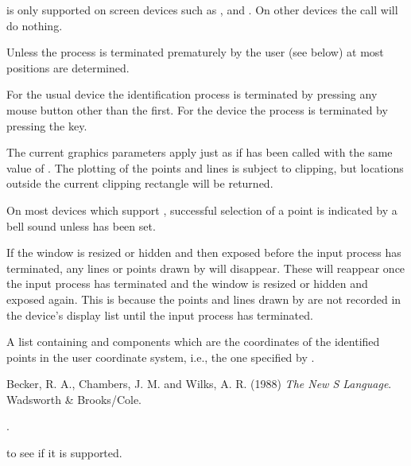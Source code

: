 \begin{Details}\relax
{} is only supported on screen devices such as
,  and .  On other devices the
call will do nothing.

Unless the process is terminated prematurely by the user (see below)
at most  positions are determined.

For the usual  device the identification process is
terminated by pressing any mouse button other than the first.
For the  device the process is terminated by
pressing the  key.

The current graphics parameters apply just as if 
has been called with the same value of . The plotting of
the points and lines is subject to clipping, but locations outside the
current clipping rectangle will be returned.

On most devices which support , successful selection of
a point is indicated by a bell sound unless
 has been set.

If the window is resized or hidden and then exposed before the input
process has terminated, any lines or points drawn by 
will disappear.  These will reappear once the input process has
terminated and the window is resized or hidden and exposed again.
This is because the points and lines drawn by  are not
recorded in the device's display list until the input process has
terminated.
\end{Details}
%
\begin{Value}
A list containing  and  components which are the
coordinates of the identified points in the user coordinate system,
i.e., the one specified by .
\end{Value}
%
\begin{References}\relax
Becker, R. A., Chambers, J. M. and Wilks, A. R. (1988)
\emph{The New S Language}.
Wadsworth \& Brooks/Cole.
\end{References}
%
\begin{SeeAlso}\relax
{}.

 to see if it is supported.
\end{SeeAlso}
